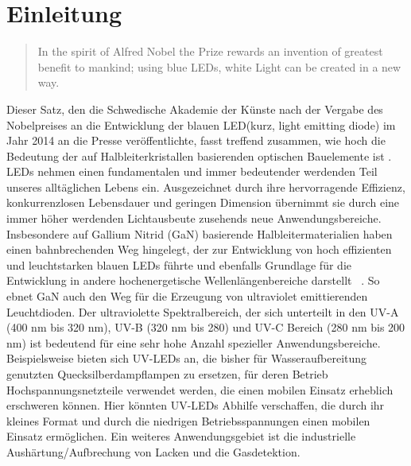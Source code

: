
\chapter{Einleitung}
\thispagestyle{fancy}

\begin{quote}
In the spirit of Alfred Nobel the Prize rewards an invention of greatest benefit to mankind; using blue LEDs, white Light can be created in a new way.\end{quote}
\noindent
Dieser Satz, den die Schwedische Akademie der Künste nach der Vergabe des Nobelpreises an die Entwicklung der blauen LED(kurz, light emitting diode) im Jahr 2014 an die Presse veröffentlichte, fasst treffend zusammen, wie hoch die Bedeutung der auf Halbleiterkristallen basierenden optischen Bauelemente ist \cite{kneissl}. LEDs nehmen einen fundamentalen und immer bedeutender werdenden Teil unseres alltäglichen Lebens ein. Ausgezeichnet durch ihre hervorragende Effizienz, konkurrenzlosen Lebensdauer und geringen Dimension übernimmt sie durch eine immer höher werdenden Lichtausbeute zusehends neue Anwendungsbereiche. Insbesondere auf Gallium Nitrid (GaN) basierende Halbleitermaterialien haben einen bahnbrechenden Weg hingelegt, der zur Entwicklung von hoch effizienten und leuchtstarken blauen LEDs führte und ebenfalls Grundlage für die Entwicklung in andere hochenergetische Wellenlängenbereiche darstellt ~\cite{risk}. So ebnet GaN auch den Weg für die Erzeugung von ultraviolet emittierenden Leuchtdioden. Der ultraviolette Spektralbereich, der sich unterteilt in den UV-A (400 nm bis 320 nm), UV-B (320 nm bis 280) und UV-C Bereich (280 nm bis 200 nm) ist bedeutend für eine sehr hohe Anzahl spezieller Anwendungsbereiche. Beispielsweise bieten sich UV-LEDs an, die bisher für Wasseraufbereitung genutzten Quecksilberdampflampen zu ersetzen, für deren Betrieb Hochspannungsnetzteile verwendet werden, die einen mobilen Einsatz erheblich erschweren können. Hier könnten UV-LEDs Abhilfe verschaffen, die durch ihr kleines Format und durch die niedrigen Betriebsspannungen einen mobilen Einsatz ermöglichen. Ein weiteres Anwendungsgebiet ist die industrielle Aushärtung/Aufbrechung von Lacken und die Gasdetektion. 
%
